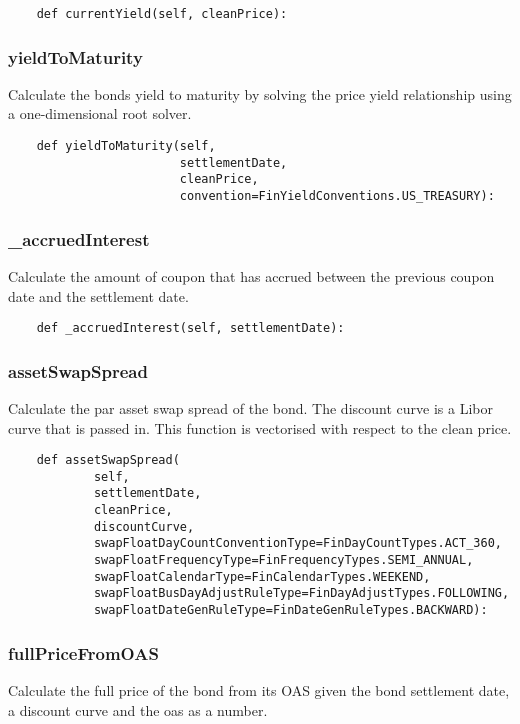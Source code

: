 \documentclass[twoside,11pt]{book}
\begin{document}
\begin{lstlisting}
    def currentYield(self, cleanPrice):
\end{lstlisting}

\subsubsection*{{\bf yieldToMaturity}}
Calculate the bonds yield to maturity by solving the price yield relationship using a one-dimensional root solver.  

\begin{lstlisting}
    def yieldToMaturity(self,
                        settlementDate,
                        cleanPrice,
                        convention=FinYieldConventions.US_TREASURY):
\end{lstlisting}

\subsubsection*{{\bf \_accruedInterest}}
Calculate the amount of coupon that has accrued between the previous coupon date and the settlement date.  

\begin{lstlisting}
    def _accruedInterest(self, settlementDate):
\end{lstlisting}

\subsubsection*{{\bf assetSwapSpread}}
Calculate the par asset swap spread of the bond. The discount curve is a Libor curve that is passed in. This function is vectorised with respect to the clean price.  

\begin{lstlisting}
    def assetSwapSpread(
            self,
            settlementDate,
            cleanPrice,
            discountCurve,
            swapFloatDayCountConventionType=FinDayCountTypes.ACT_360,
            swapFloatFrequencyType=FinFrequencyTypes.SEMI_ANNUAL,
            swapFloatCalendarType=FinCalendarTypes.WEEKEND,
            swapFloatBusDayAdjustRuleType=FinDayAdjustTypes.FOLLOWING,
            swapFloatDateGenRuleType=FinDateGenRuleTypes.BACKWARD):
\end{lstlisting}

\subsubsection*{{\bf fullPriceFromOAS}}
Calculate the full price of the bond from its OAS given the bond settlement date, a discount curve and the oas as a number.  
\end{document}

